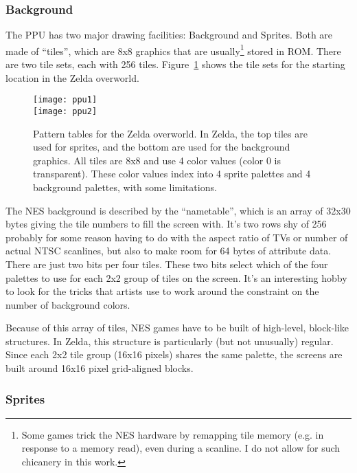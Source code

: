 \documentclass[twocolumn]{article}
\begin{document}
\subsubsection{Background}
The PPU has two major drawing facilities: Background and Sprites. Both
are made of ``tiles'', which are 8x8 graphics that are
usually\footnote{Some games trick the NES hardware by remapping tile
memory (e.g. in response to a memory read), even during a scanline. I
do not allow for such chicanery in this work.} stored in ROM. There
are two tile sets, each with 256 tiles. Figure~\ref{fig:ppu} shows the
tile sets for the starting location in the Zelda overworld.

\begin{figure}[ht]
\begin{center}
\texttt{[image: ppu1]} \\
\vspace{1em}
\texttt{[image: ppu2]}
\end{center}\vspace{-0.1in}
\caption{Pattern tables for the Zelda overworld. In Zelda, the top tiles
are used for sprites, and the bottom are used for the background graphics.
All tiles are 8x8 and use 4 color values (color 0 is transparent). These
color values index into 4 sprite palettes and 4 background palettes, with
some limitations.
} \label{fig:ppu}
\end{figure}

The NES background is described by the ``nametable'', which is an
array of 32x30 bytes giving the tile numbers to fill the screen with.
It's two rows shy of 256 probably for some reason having to do with
the aspect ratio of TVs or number of actual NTSC scanlines, but also
to make room for 64 bytes of attribute data. There are just two bits
per four tiles. These two bits select which of the four palettes to
use for each 2x2 group of tiles on the screen. It's an interesting hobby to
look for the tricks that artists use to work around the constraint on
the number of background colors. %

Because of this array of tiles, NES games have to be built of
high-level, block-like structures. In Zelda, this structure is
particularly (but not unusually) regular. Since each 2x2 tile group
(16x16 pixels) shares the same palette, the screens are built around
16x16 pixel grid-aligned blocks.

\subsubsection{Sprites} \label{sec:sprites}
\end{document}
